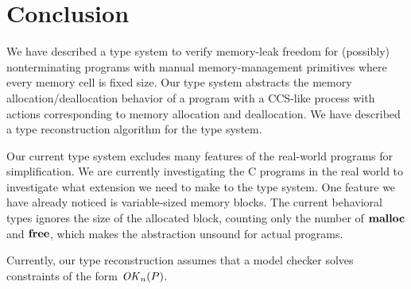 \section{Conclusion}

We have described a type system to verify memory-leak freedom for
(possibly) nonterminating programs with manual memory-management
primitives where every memory cell is fixed size.  Our type system
abstracts the memory allocation/deallocation behavior of a program
with a CCS-like process with actions corresponding to memory
allocation and deallocation.  We have described a type reconstruction
algorithm for the type system.

Our current type system excludes many features of the real-world
programs for simplification.  We are currently investigating the C
programs in the real world to investigate what extension we need to
make to the type system.  One feature we have already noticed is
variable-sized memory blocks.  The current behavioral types ignores
the size of the allocated block, counting only the number of
\(\mathbf{malloc}\) and \(\mathbf{free}\), which makes the abstraction unsound for
actual programs.

Currently, our type reconstruction assumes that a model checker solves
constraints of the form \(\mathit{OK}_n(P)\).  

